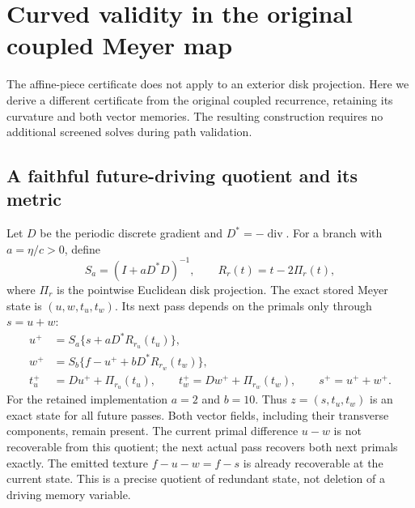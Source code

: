 \section{Curved validity in the original coupled Meyer map}\label{sec:curved}
The affine-piece certificate does not apply to an exterior disk projection.
Here we derive a different certificate from the original coupled recurrence,
retaining its curvature and both vector memories. The resulting construction
requires no additional screened solves during path validation.

\subsection{A faithful future-driving quotient and its metric}
Let $D$ be the periodic discrete gradient and $D^*=-\operatorname{div}$.
For a branch with $a=\eta/c>0$, define
\[
 S_a=(I+aD^*D)^{-1},\qquad R_r(t)=t-2\Pi_r(t),
\]
where $\Pi_r$ is the pointwise Euclidean disk projection. The exact stored
Meyer state is $(u,w,t_u,t_w)$. Its next pass depends on the primals only
through $s=u+w$:
\begin{align}
 u^+&=S_a\{s+aD^*R_{r_u}(t_u)\},\nonumber\\
 w^+&=S_b\{f-u^++bD^*R_{r_w}(t_w)\},\nonumber\\
 t_u^+&=Du^++\Pi_{r_u}(t_u),\qquad
 t_w^+=Dw^++\Pi_{r_w}(t_w),\qquad s^+=u^++w^+.
 \label{eq:meyerquotient}
\end{align}
For the retained implementation $a=2$ and $b=10$. Thus
$z=(s,t_u,t_w)$ is an exact state for all future passes. Both vector fields,
including their transverse components, remain present. The current primal
difference $u-w$ is not recoverable from this quotient; the next actual pass
recovers both next primals exactly. The emitted texture $f-u-w=f-s$ is
already recoverable at the current state. This is a precise quotient of
redundant state, not deletion of a driving memory variable.

